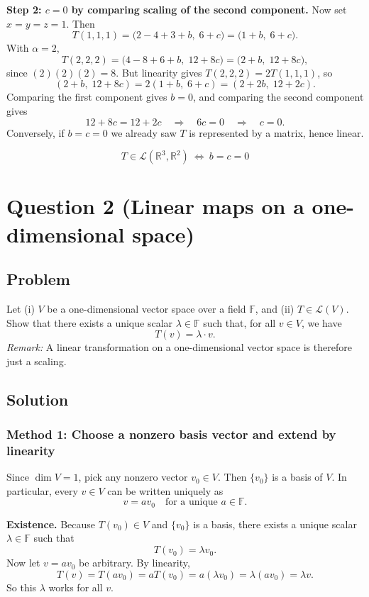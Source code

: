 \documentclass[12pt]{article}
\newcommand{\R}{\mathbb{R}}
\newcommand{\F}{\mathbb{F}}
\newcommand{\cL}{\mathcal{L}}
\begin{document}
\medskip
\noindent\textbf{Step 2: $c=0$ by comparing scaling of the second component.}
Now set $x=y=z=1$. Then
\[
T(1,1,1)=\bigl(2-4+3+b,\;6+c\bigr)=\bigl(1+b,\;6+c\bigr).
\]
With $\alpha=2$,
\[
T(2,2,2)=\bigl(4-8+6+b,\;12+8c\bigr)=\bigl(2+b,\;12+8c\bigr),
\]
since $(2)(2)(2)=8$.
But linearity gives $T(2,2,2)=2T(1,1,1)$, so
\[
(2+b,\;12+8c)=2(1+b,\;6+c)=(2+2b,\;12+2c).
\]
Comparing the first component gives $b=0$, and comparing the second component gives
\[
12+8c=12+2c\quad\Rightarrow\quad 6c=0\quad\Rightarrow\quad c=0.
\]
Conversely, if $b=c=0$ we already saw $T$ is represented by a matrix, hence linear.

\[
\boxed{\,T\in\cL(\R^3,\R^2)\ \Longleftrightarrow\ b=c=0\,}
\]

\newpage
\section{Question 2 (Linear maps on a one-dimensional space)}
\subsection{Problem}
Let (i) $V$ be a one-dimensional vector space over a field $\F$, and (ii) $T\in \cL(V)$.
Show that there exists a unique scalar $\lambda\in \F$ such that, for all $v\in V$, we have
\[
T(v)=\lambda\cdot v.
\]
\emph{Remark:} A linear transformation on a one-dimensional vector space is therefore just a scaling.

\subsection{Solution}

\subsubsection{Method 1: Choose a nonzero basis vector and extend by linearity}
Since $\dim V=1$, pick any nonzero vector $v_0\in V$. Then $\{v_0\}$ is a basis of $V$.
In particular, every $v\in V$ can be written uniquely as
\[
v = a v_0 \quad \text{for a unique } a\in\F.
\]

\medskip
\noindent\textbf{Existence.}
Because $T(v_0)\in V$ and $\{v_0\}$ is a basis, there exists a unique scalar $\lambda\in\F$ such that
\[
T(v_0)=\lambda v_0.
\]
Now let $v=av_0$ be arbitrary. By linearity,
\[
T(v)=T(av_0)=aT(v_0)=a(\lambda v_0)=\lambda (a v_0)=\lambda v.
\]
So this $\lambda$ works for all $v$.
\end{document}
